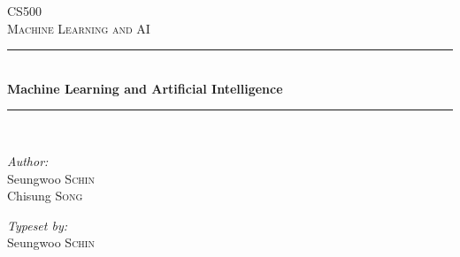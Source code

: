 \documentclass[twoside]{article}
\begin{document}
\begin{titlepage}

\newcommand{\HRule}{\rule{\linewidth}{0.5mm}} %

\center %
 

\vspace*{3cm}
\textsc{\Large CS500}\\[0.5cm] %
\textsc{\large Machine Learning and AI}\\[0.5cm] %


\HRule \\[0.4cm]
{ \huge \bfseries Machine Learning and Artificial Intelligence}\\[0.4cm] %
\HRule \\[1.5cm]
 

\begin{minipage}{0.4\textwidth}
\begin{flushleft} \large
\emph{Author:}\\
Seungwoo \textsc{Schin} \\%
Chisung \textsc{Song}
\end{flushleft}
\end{minipage}
\begin{minipage}{0.4\textwidth}
\begin{flushright} \large
\emph{Typeset by:} \\
Seungwoo \textsc{Schin} %
\end{flushright}
\end{minipage}\\[4cm]



\end{titlepage}
\end{document}
